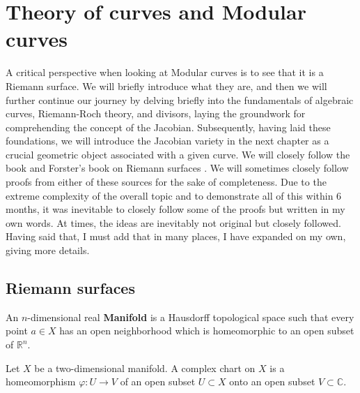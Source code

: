 
\section{Theory of curves and Modular curves}
A critical perspective when looking at Modular curves is to see that it is a Riemann surface. We will briefly introduce what they are, and then we will further continue our journey by delving briefly into the fundamentals of algebraic curves, Riemann-Roch theory, and divisors, laying the groundwork for comprehending the concept of the Jacobian. Subsequently, having laid these foundations, we will introduce the Jacobian variety in the next chapter as a crucial geometric object associated with a given curve. We will closely follow the book \cite{diamond2005first} and Forster's book on Riemann surfaces \cite{For}. We will sometimes closely follow proofs from either of these sources for the sake of completeness. Due to the extreme complexity of the overall topic and to demonstrate all of this within 6 months, it was inevitable to closely follow some of the proofs but written in my own words. At times, the ideas are inevitably not original but closely followed. Having said that, I must add that in many places, I have expanded on my own, giving more details.

\subsection{Riemann surfaces}
\begin{definition}[Manifold]
    An $n$-dimensional real \textbf{Manifold} is a Hausdorff topological space such that every point $a \in X$ has an open neighborhood which is homeomorphic to an open subset of $\mathbb{R}^{n}$.
\end{definition}

\begin{definition}
    Let $X$ be a two-dimensional manifold. A complex chart on $X$ is a homeomorphism $\varphi: U \rightarrow V$ of an open subset $U \subset X$ onto an open subset $V \subset \mathbb{C}$. 
\end{definition}

